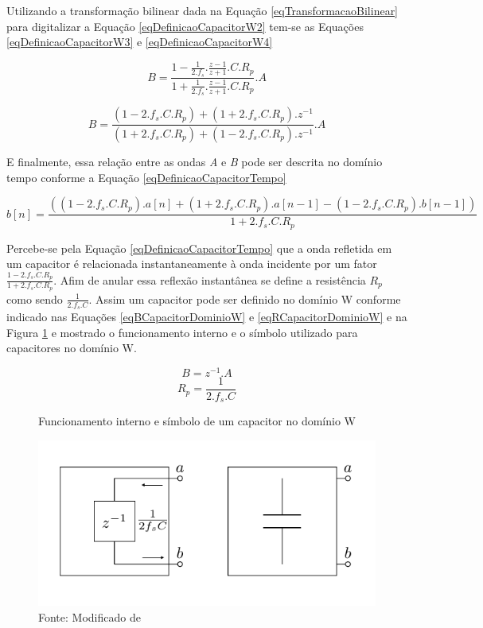 	Utilizando a transformação bilinear dada na Equação \ref{eqTransformacaoBilinear} para digitalizar a Equação \ref{eqDefinicaoCapacitorW2} tem-se as Equações \ref{eqDefinicaoCapacitorW3} e \ref{eqDefinicaoCapacitorW4}
	
	
	\begin{equation}
		\label{eqDefinicaoCapacitorW3}
		B = \frac{1-\frac{1}{2.f_s}.\frac{z-1}{z+1}.C.R_p}{1+\frac{1}{2.f_s}.\frac{z-1}{z+1}.C.R_p}.A
	\end{equation} 
	
	\begin{equation}
		\label{eqDefinicaoCapacitorW4}
		B = \frac{(1-2.f_s.C.R_p)+(1+2.f_s.C.R_p).z^{-1}}{(1+2.f_s.C.R_p)+(1-2.f_s.C.R_p).z^{-1}}.A
	\end{equation}
	
	E finalmente, essa relação entre as ondas \textit{A} e \textit{B} pode ser descrita no domínio tempo conforme a Equação \ref{eqDefinicaoCapacitorTempo}
	
	\begin{equation}
		\label{eqDefinicaoCapacitorTempo}
		b[n] = \frac{((1-2.f_s.C.R_p).a[n]+(1+2.f_s.C.R_p).a[n-1]-(1-2.f_s.C.R_p).b[n-1])}{1+2.f_s.C.R_p}	\end{equation}
	
	Percebe-se pela Equação \ref{eqDefinicaoCapacitorTempo} que a onda refletida em um capacitor é relacionada instantaneamente à onda incidente por um fator $\frac{1-2.f_s.C.R_p}{1+2.f_s.C.R_p}$. Afim de anular essa reflexão instantânea se define a resistência $R_p$ como sendo $\frac{1}{2.f_s.C}$. Assim um capacitor pode ser definido no domínio W conforme indicado nas Equações \ref{eqBCapacitorDominioW} e \ref{eqRCapacitorDominioW} e na Figura \ref{figCapacitorDominioW} e mostrado o funcionamento interno e o símbolo utilizado para capacitores no domínio W.
	
	\begin{equation}
	\label{eqBCapacitorDominioW}
		B = z^{-1}.A
	\end{equation}
	\begin{equation}
	\label{eqRCapacitorDominioW}
		R_p = \frac{1}{2.f_s.C}
	\end{equation}
	
	\begin{figure}[h]
		\label{figCapacitorDominioW}
		\caption{Funcionamento interno e símbolo de um capacitor no domínio W}
		\includegraphics[scale=0.5]{images/capacitor}
		\centering
		\caption*{Fonte: Modificado de \cite{Bogason2017}}
	\end{figure}
	
